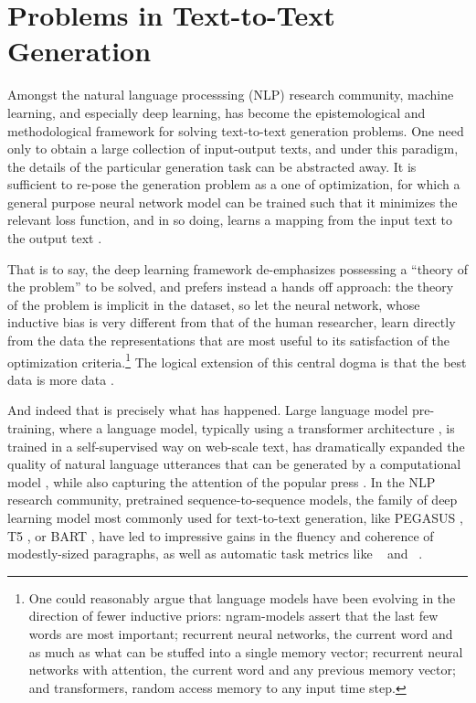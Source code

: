 \section{Problems in Text-to-Text Generation}
  
Amongst the natural language processsing (NLP) research community, machine
learning, and especially deep learning, has become the 
epistemological and methodological framework  for solving text-to-text
generation problems.  One need only to obtain a large collection of
input-output texts, and under this paradigm, the details of the particular
generation task can be abstracted away. It is sufficient to re-pose the
generation problem as a one of optimization, for which a general purpose
neural network model can be trained such that it minimizes the relevant loss
function, and in so doing, learns a mapping from the input text to the output
text \citep{sutskever2014,bahdanau2015,rush2015,nallapati2016,see2017}. 

That is to say, the deep learning framework de-emphasizes possessing a
``theory of the problem'' to be solved, and prefers instead a hands off
approach: the theory of the problem is implicit in the dataset, so let the
neural network, whose inductive bias is very different from that of the human
researcher, learn directly from the data the representations that are most
useful to its satisfaction of the optimization criteria.\footnote{One could
reasonably argue that language models have been evolving in the direction of
fewer inductive priors: ngram-models assert that the last few words are most
important; recurrent neural networks, the current word and as much as what can
be stuffed into a single memory vector; recurrent neural networks with
attention, the current word and any previous memory vector; and transformers,
random access memory to any input time step.} The logical extension of this
central dogma is that the best data is more data \citep{halevy2009}.  

And indeed that is precisely what has happened. Large language model
pre-training, where a language model, typically using a transformer
architecture \citep{vaswani2017}, is trained in a self-supervised way on
web-scale text, has dramatically expanded the quality of natural language
utterances that can be generated by a computational model
\citep{radford2019,brown2020}, while also capturing the attention of the
popular press \citep{simonite2019,vincent2019}. In the NLP research community,
pretrained sequence-to-sequence models, the family of deep learning model most
commonly used for text-to-text generation, like PEGASUS \citep{zhang2019}, T5
\citep{raffel2020}, or BART \citep{lewis2020}, have led to impressive gains in
the fluency and coherence of modestly-sized paragraphs, as well as automatic
task metrics like \bleu~\citep{papineni2002} and \rouge~\citep{lin2004}.

